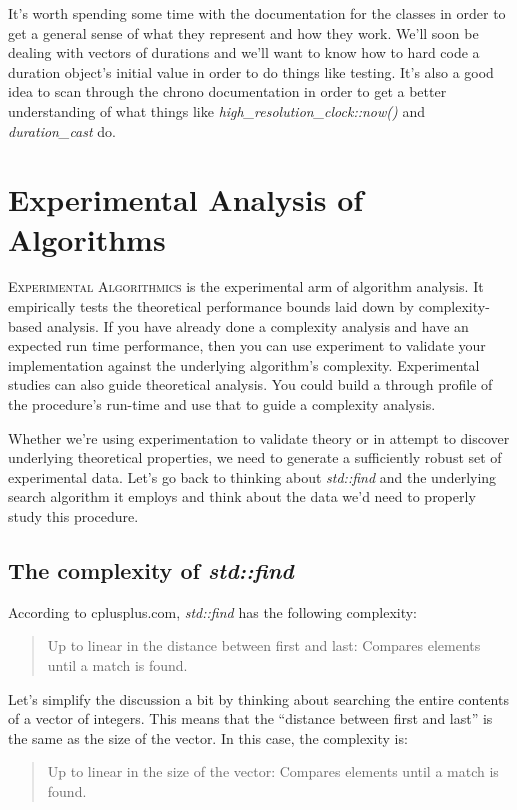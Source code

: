 \documentclass[]{tufte-handout}
\begin{document}
It's worth spending some time with the documentation for the classes in order to get a general sense of what they represent and how they work. We'll soon be dealing with vectors of durations and we'll want to know how to hard code a duration object's initial value in order to do things like testing. It's also a good idea to scan through the chrono documentation in order to get a better understanding of what things like \textit{high\_resolution\_clock::now()} and \textit{duration\_cast} do.

\section{Experimental Analysis of Algorithms}

\textsc{Experimental Algorithmics} is the experimental arm of algorithm analysis.  It empirically tests the theoretical performance bounds laid down by complexity-based analysis. If you have already done a complexity analysis and have an expected run time performance, then you can use experiment to validate your implementation against the underlying algorithm's complexity.  Experimental studies can also guide theoretical analysis. You could build a through profile of the procedure's run-time and use that to guide a complexity analysis. 

Whether we're using experimentation to validate theory or in attempt to discover underlying theoretical properties, we need to generate a sufficiently robust set of experimental data. Let's go back to thinking about \textit{std::find} and the underlying search algorithm it employs and think about the data we'd need to properly study this procedure.

\subsection{The complexity of \textit{std::find}}

According to cplusplus.com, \textit{std::find} has the following complexity:
\begin{quote}
Up to linear in the distance between first and last: Compares elements until a match is found.
\end{quote}
Let's simplify the discussion a bit by thinking about searching the entire contents of a vector of integers. This means that the ``distance between first and last'' is the same as the size of the vector. In this case, the complexity is:
\begin{quote}
Up to linear in the size of the vector: Compares elements until a match is found.
\end{quote}
\end{document}
